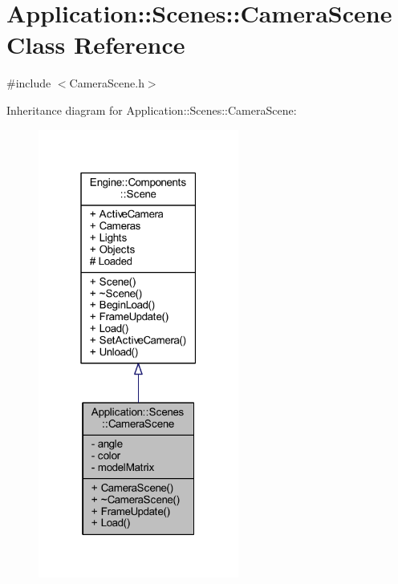 \hypertarget{classApplication_1_1Scenes_1_1CameraScene}{}\section{Application\+:\+:Scenes\+:\+:Camera\+Scene Class Reference}
\label{classApplication_1_1Scenes_1_1CameraScene}


{\ttfamily \#include $<$Camera\+Scene.\+h$>$}



Inheritance diagram for Application\+:\+:Scenes\+:\+:Camera\+Scene\+:
\nopagebreak
\begin{figure}[H]
\begin{center}
\leavevmode
\includegraphics[width=187pt]{classApplication_1_1Scenes_1_1CameraScene__inherit__graph}
\end{center}
\end{figure}


